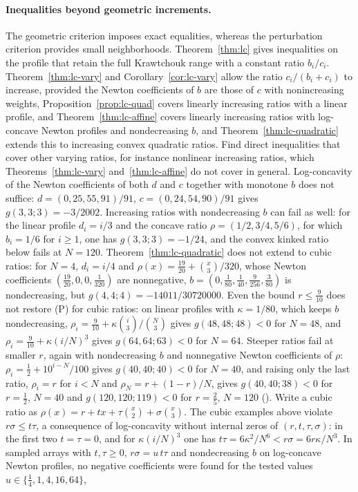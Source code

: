 \documentclass[twoside,10pt]{article}
\makeatletter
\numberwithin{equation}{section}
\theoremstyle{slbody}
\theoremstyle{definition}
\theoremstyle{remark}
\renewcommand{\section}{\@startsection{section}{1}{\z@}{-3.5ex \@plus -1ex \@minus -.2ex}{2.3ex \@plus .2ex}{\normalfont\large\bfseries}}
\makeatother
\begin{document}
\section{Open problems}\label{sec:open}

\paragraph{Inequalities beyond geometric increments.}
The geometric criterion imposes exact equalities, whereas the perturbation criterion provides small neighborhoods. Theorem~\ref{thm:lc} gives inequalities on the profile that retain the full Krawtchouk range with a constant ratio $b_i/c_i$. Theorem~\ref{thm:lc-vary} and Corollary~\ref{cor:lc-vary} allow the ratio $c_i/(b_i+c_i)$ to increase, provided the Newton coefficients of $b$ are those of $c$ with nonincreasing weights, Proposition~\ref{prop:lc-quad} covers linearly increasing ratios with a linear profile, and Theorem~\ref{thm:lc-affine} covers linearly increasing ratios with log-concave Newton profiles and nondecreasing $b$, and Theorem~\ref{thm:lc-quadratic} extends this to increasing convex quadratic ratios. Find direct inequalities that cover other varying ratios, for instance nonlinear increasing ratios, which Theorems~\ref{thm:lc-vary} and~\ref{thm:lc-affine} do not cover in general. Log-concavity of the Newton coefficients of both $d$ and $c$ together with monotone $b$ does not suffice: $d=(0,25,55,91)/91$, $c=(0,24,54,90)/91$ gives $g(3,3;3)=-3/2002$. Increasing ratios with nondecreasing $b$ can fail as well: for the linear profile $d_i=i/3$ and the concave ratio $\rho=(1/2,3/4,5/6)$, for which $b_i=1/6$ for $i\geq1$, one has $g(3,3;3)=-1/24$, and the convex kinked ratio below fails at $N=120$. Theorem~\ref{thm:lc-quadratic} does not extend to cubic ratios: for $N=4$, $d_i=i/4$ and $\rho(x)=\frac{19}{20}+\binom x3/320$, whose Newton coefficients $(\frac{19}{20},0,0,\frac1{320})$ are nonnegative, $b=(0,\frac1{80},\frac1{40},\frac9{256},\frac3{80})$ is nondecreasing, but $g(4,4;4)=-14011/30720000$. Even the bound $r\leq\frac9{10}$ does not restore (P) for cubic ratios: on linear profiles with $\kappa=1/80$, which keeps $b$ nondecreasing, $\rho_i=\frac9{10}+\kappa\binom i3/\binom N3$ gives $g(48,48;48)<0$ for $N=48$, and $\rho_i=\frac9{10}+\kappa(i/N)^3$ gives $g(64,64;63)<0$ for $N=64$. Steeper ratios fail at smaller $r$, again with nondecreasing $b$ and nonnegative Newton coefficients of $\rho$: $\rho_i=\frac12+10^{i-N}/100$ gives $g(40,40;40)<0$ for $N=40$, and raising only the last ratio, $\rho_i=r$ for $i<N$ and $\rho_N=r+(1-r)/N$, gives $g(40,40;38)<0$ for $r=\frac12$, $N=40$ and $g(120,120;119)<0$ for $r=\frac25$, $N=120$ (). Write a cubic ratio as $\rho(x)=r+tx+\tau\binom x2+\sigma\binom x3$. The cubic examples above violate $r\sigma\leq t\tau$, a consequence of log-concavity without internal zeros of $(r,t,\tau,\sigma)$: in the first two $t=\tau=0$, and for $\kappa(i/N)^3$ one has $t\tau=6\kappa^2/N^6<r\sigma=6r\kappa/N^3$. In sampled arrays with $t,\tau\geq0$, $r\sigma=u\,t\tau$ and nondecreasing $b$ on log-concave Newton profiles, no negative coefficients were found for the tested values $u\in\{\frac14,1,4,16,64\}$, 
\end{document}
